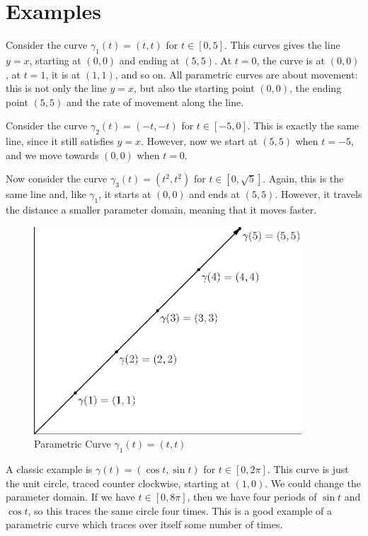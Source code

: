 \documentclass[fleqn]{report}
\begin{document}
\section{Examples}
\label{parametric-curves-examples}

\begin{example}
Consider the curve $\gamma_1(t) = (t,t)$ for $t \in [0,5]$.
This curves gives the line $y=x$, starting at $(0,0)$ and
ending at $(5,5)$. At $t=0$, the curve is at $(0,0)$, at
$t=1$, it is at $(1,1)$, and so on. All parametric curves are
about movement: this is not only the line $y=x$, but also the
starting point $(0,0)$, the ending point $(5,5)$ and the rate
of movement along the line.
\end{example}

\begin{example}
Consider the curve $\gamma_2(t) = (-t,-t)$ for $t \in [-5,0]$.
This is exactly the same line, since it still satisfies $y=x$.
However, now we start at $(5,5)$ when $t=-5$, and we move
towards $(0,0)$ when $t=0$. 
\end{example}

\begin{example}
Now consider the curve $\gamma_3(t) = (t^2,t^2)$ for $t \in
[0,\sqrt{5}]$. Again, this is the same line and, like
$\gamma_1$, it starts at $(0,0)$ and ends at $(5,5)$.
However, it travels the distance a smaller parameter domain,
meaning that it moves faster.
\end{example}

\begin{figure}[ht]
\centering
\includegraphics[width=10cm]{figure10.eps}
\caption{Parametric Curve $\gamma_1(t) = (t,t)$}
\label{figure-parametric-curve1}
\end{figure}

\begin{example}
A classic example is $\gamma(t) = (\cos t, \sin t)$ for $t \in
[0,2\pi]$. This curve is just the unit circle, traced counter
clockwise, starting at $(1,0)$. We could change the parameter
domain. If we have $t \in [0,8\pi]$, then we have four
periods of $\sin t$ and $\cos t$, so this traces the same
circle four times. This is a good example of a parametric
curve which traces over itself some number of times.
\end{example}
\end{document}
